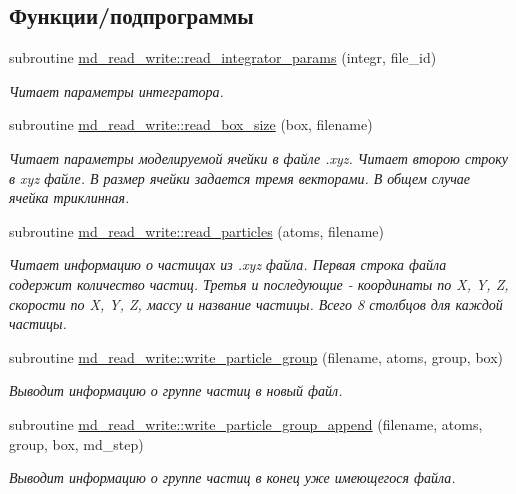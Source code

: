\subsection*{Функции/подпрограммы}
\begin{DoxyCompactItemize}
\item 
subroutine \mbox{\hyperlink{namespacemd__read__write_a13e739c9b44b3100ee36e864eac3d5e0}{md\+\_\+read\+\_\+write\+::read\+\_\+integrator\+\_\+params}} (integr, file\+\_\+id)
\begin{DoxyCompactList}\small\item\em Читает параметры интегратора. \end{DoxyCompactList}\item 
subroutine \mbox{\hyperlink{namespacemd__read__write_ace09a29b4fd526f8ed784c90098279c4}{md\+\_\+read\+\_\+write\+::read\+\_\+box\+\_\+size}} (box, filename)
\begin{DoxyCompactList}\small\item\em Читает параметры моделируемой ячейки в файле .xyz.  Читает второю строку в xyz файле. В размер ячейки задается тремя векторами. В общем случае ячейка триклинная. \end{DoxyCompactList}\item 
subroutine \mbox{\hyperlink{namespacemd__read__write_a1a0fd7df876318fd4247d110936384d8}{md\+\_\+read\+\_\+write\+::read\+\_\+particles}} (atoms, filename)
\begin{DoxyCompactList}\small\item\em Читает информацию о частицах из .xyz файла.  Первая строка файла содержит количество частиц. Третья и последующие -\/ координаты по X, Y, Z, скорости по X, Y, Z, массу и название частицы. Всего 8 столбцов для каждой частицы. \end{DoxyCompactList}\item 
subroutine \mbox{\hyperlink{namespacemd__read__write_a20f73c896cf124f2e1da6ccbf23cc12d}{md\+\_\+read\+\_\+write\+::write\+\_\+particle\+\_\+group}} (filename, atoms, group, box)
\begin{DoxyCompactList}\small\item\em Выводит информацию о группе частиц в новый файл. \end{DoxyCompactList}\item 
subroutine \mbox{\hyperlink{namespacemd__read__write_a24453b47bb1935e66563cd522e09e3af}{md\+\_\+read\+\_\+write\+::write\+\_\+particle\+\_\+group\+\_\+append}} (filename, atoms, group, box, md\+\_\+step)
\begin{DoxyCompactList}\small\item\em Выводит информацию о группе частиц в конец уже имеющегося файла. \end{DoxyCompactList}\end{DoxyCompactItemize}
